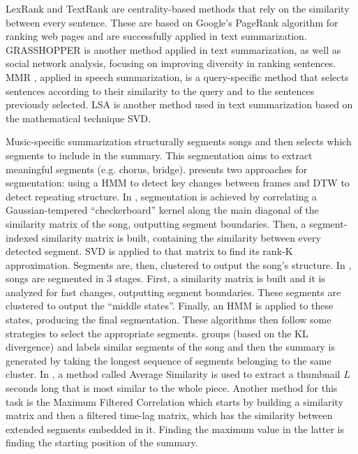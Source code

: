 \documentclass[11pt,onecolumn,draftcls]{IEEEtran}
\begin{document}
LexRank \cite{Erkan2004} and TextRank \cite{Mihalcea2004} are centrality-based
methods that rely on the similarity between every sentence. These are based on
Google's PageRank \cite{Brin1998} algorithm for ranking web pages and are
successfully applied in text summarization. GRASSHOPPER \cite{Zhu2007} is
another method applied in text summarization, as well as social network
analysis, focusing on improving diversity in ranking sentences. \ac{MMR}
\cite{Zechner2000,Murray2005}, applied in speech summarization, is a
query-specific method that selects sentences according to their similarity to
the query and to the sentences previously selected. \ac{LSA} \cite{Gong2001} is
another method used in text summarization based on the mathematical technique
\ac{SVD}.

Music-specific summarization structurally segments songs and then selects which
segments to include in the summary. This segmentation aims to extract meaningful
segments (e.g. chorus, bridge). \cite{Chai} presents two approaches for
segmentation: using a \ac{HMM} to detect key changes between frames and
\ac{DTW} to detect repeating structure. In \cite{Cooper2003}, segmentation is achieved
by correlating a Gaussian-tempered ``checkerboard'' kernel along the main diagonal
of the similarity matrix of the song, outputting segment boundaries. Then, a
segment-indexed similarity matrix is built, containing the similarity between
every detected segment. \ac{SVD} is applied to that matrix to find its
rank-K approximation. Segments are, then, clustered to output the song's
structure. In \cite{Peeters2002,Peeters2003}, songs are segmented in 3
stages. First, a similarity matrix is built and it is analyzed for fast changes,
outputting segment boundaries. These segments are clustered to output the
``middle states''. Finally, an \ac{HMM} is applied to these states, producing
the final segmentation. These algorithms then follow some strategies to select
the appropriate segments. \cite{Chu2000} groups (based on the \ac{KL}
divergence) and labels similar segments of the song and then the summary is
generated by taking the longest sequence of segments belonging to the same
cluster. In \cite{Cooper2002,Glaczynski2011}, a method called Average Similarity
is used to extract a thumbnail $L$ seconds long that is most similar to the
whole piece. Another method for this task is the Maximum Filtered Correlation
\cite{Bartsch2005} which starts by building a similarity matrix and then a
filtered time-lag matrix, which has the similarity between extended segments
embedded in it. Finding the maximum value in the latter is finding the starting
position of the summary.
\end{document}
